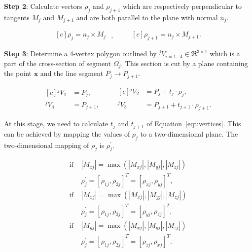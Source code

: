 \noindent \textbf{Step 2}:
Calculate vectors $\rho_j$ and $\rho_{j+1}$ which are respectively perpendicular to tangents $M_j$ and $M_{j+1}$ and are both parallel to the plane with normal $n_j$.

\begin{equation}
\begin{aligned}[c]
\rho_j = n_j \times M_j
\end{aligned}
\mbox{ , }
\qquad
\begin{aligned}[c]
\rho_{j+1} = n_j \times M_{j+1} \mbox{.}
\end{aligned}
\label{eqt:rho}
\end{equation}

\noindent \textbf{Step 3}:
Determine a 4-vertex polygon outlined by \mbox{${^jV}_{i=1...4}\in \Re^{3 \times 1}$} which is a part of the cross-section of segment $\Omega_j$.
This section is cut by a plane containing the point $\textbf{x}$ and the line segment $P_j \rightarrow P_{j+1}$.

\begin{equation}
\begin{aligned}[c]
{^jV}_1 &= P_j \mbox{,} \\
{^jV}_4 &= P_{j+1} \mbox{,}
\end{aligned}
\qquad
\begin{aligned}[c]
{^jV}_2 &= P_j + t_j \cdot \rho_j \mbox{,} \\
{^jV}_3 &= P_{j+1} + t_{j+1} \cdot\rho_{j+1} \mbox{.}
\end{aligned}
\label{eqt:vertices}
\end{equation}

At this stage, we need to calculate $t_j$ and $t_{j+1}$ of Equation~\ref{eqt:vertices}.
This can be achieved by mapping the values of $\rho_j$ to a two-dimensional plane.
The two-dimensional mapping of $\rho_j$ is $\rho^{\prime}_j$.

\begin{equation}
\begin{aligned}
\mbox{if } &|M_{zj}| = \max \left ( {|M_{xj}|,|M_{yj}|,|M_{zj}|} \right ) \\
&\rho^{\prime}_j = [\rho_{1j},\rho_{2j}]^T = [\rho_{xj},\rho_{yj}]^T \mbox{,} \\
\mbox{if } &|M_{xj}| = \max \left ( {|M_{xj}|,|M_{yj}|,|M_{zj}|} \right ) \\
&\rho^{\prime}_j = [\rho_{1j},\rho_{2j}]^T = [\rho_{yj},\rho_{zj}]^T \mbox{,} \\
\mbox{if } &|M_{yj}| = \max \left ( {|M_{xj}|,|M_{yj}|,|M_{zj}|} \right ) \\
&\rho^{\prime}_j = [\rho_{1j},\rho_{2j}]^T = [\rho_{zj},\rho_{xj}]^T \mbox{.}
\end{aligned}
\label{eqt:rhoprocess}
\end{equation}

